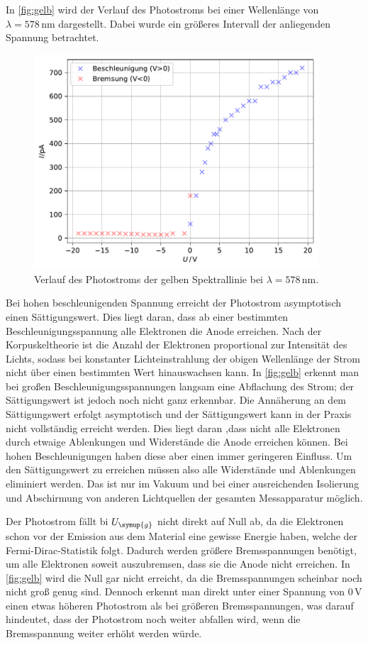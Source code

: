 In \autoref{fig:gelb} wird der Verlauf des Photostroms bei einer Wellenlänge von $\lambda = 578 \,\unit{\nm}$ dargestellt. Dabei wurde ein größeres 
Intervall der anliegenden Spannung betrachtet. 
\begin{figure}
    \centering
    \includegraphics[height = 8cm]{build/plotgelb.pdf}
    \caption{Verlauf des Photostroms der gelben Spektrallinie bei $\lambda = 578 \,\unit{\nm}$.}
    \label{fig:gelb}
\end{figure}
Bei hohen beschleunigenden Spannung erreicht der Photostrom asymptotisch einen Sättigungswert. Dies liegt daran, dass ab einer bestimmten
Beschleunigungsspannung alle Elektronen die Anode erreichen. Nach der Korpuskeltheorie ist die Anzahl der Elektronen proportional zur Intensität 
des Lichts, sodass bei konstanter Lichteinstrahlung der obigen Wellenlänge der Strom nicht über einen bestimmten Wert hinauswachsen kann. In 
\autoref{fig:gelb} erkennt man bei großen Beschleunigungsspannungen langsam eine Abflachung des Strom; der Sättigungswert ist jedoch noch nicht ganz erkennbar.
Die Annäherung an dem Sättigungswert erfolgt asymptotisch und der Sättigungswert kann in der Praxis nicht vollständig erreicht werden. Dies liegt daran ,dass 
nicht alle Elektronen durch etwaige Ablenkungen und Widerstände die Anode erreichen können. Bei hohen Beschleunigungen haben diese aber einen immer geringeren 
Einfluss. Um den Sättigungswert zu erreichen müssen also alle Widerstände und Ablenkungen eliminiert werden. Das ist nur im Vakuum und bei einer ausreichenden 
Isolierung und Abschirmung von anderen Lichtquellen der  gesamten Messapparatur möglich.

Der Photostrom fällt bi $U_{\symup{g}}$ nicht direkt auf Null ab, da die Elektronen schon vor der Emission aus dem Material eine gewisse Energie 
haben, welche der Fermi-Dirac-Statistik folgt. Dadurch werden größere Bremsspannungen benötigt, um alle Elektronen soweit auszubremsen, dass sie die 
Anode nicht erreichen. In \autoref{fig:gelb} wird die Null gar nicht erreicht, da die Bremsspannungen scheinbar noch nicht groß genug sind. Dennoch erkennt 
man direkt unter einer Spannung von $0\,\unit{\volt}$ einen etwas höheren Photostrom als bei größeren Bremsspannungen, was darauf hindeutet, dass 
der Photostrom noch weiter abfallen wird, wenn die Bremsspannung weiter erhöht werden würde.


